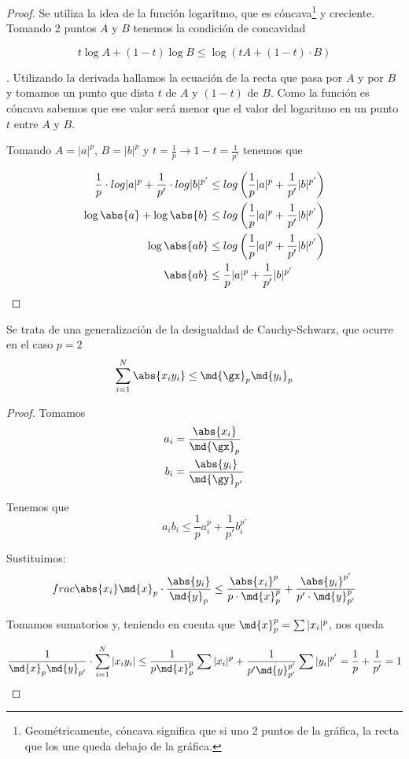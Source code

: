 \documentclass{apuntes}
\begin{document}
\begin{proof}
Se utiliza la idea de la función logaritmo, que es cóncava\footnote{Geométricamente, cóncava significa que si uno 2 puntos de la gráfica, la recta que los une queda debajo de la gráfica.} y creciente.  Tomando 2 puntos $A$ y $B$ tenemos la condición de concavidad 

\[ t \log A + (1-t) \log B \leq \log (tA + (1-t) \cdot B)\]

. Utilizando la derivada hallamos la ecuación de la recta que pasa por $A$ y por $B$ y tomamos un punto que dista $t$ de $A$ y $(1-t)$ de $B$. Como la función es cóncava sabemos que ese valor será menor que el valor del logaritmo en un punto $t$ entre $A$ y $B$.

Tomando $A=|a| ^ p$, $B = |b| ^ p$ y $t = \frac{1}{p} \rightarrow 1-t = \frac{1}{p'}$ tenemos que

\begin{align*}
\frac{1}{p}\cdot log |a|^p + \frac{1}{p'} \cdot log|b|^{p'} &\leq log\left(\frac{1}{p}|a|^p + \frac{1}{p'} |b|^{p'}\right) \\
\log \abs{a} + \log \abs{b} &\leq log\left(\frac{1}{p}|a|^p + \frac{1}{p'} |b|^{p'}\right) \\
\log \abs{ab} &\leq log\left(\frac{1}{p}|a|^p + \frac{1}{p'} |b|^{p'}\right) \\
\abs{ab} &\leq \frac{1}{p}|a|^p + \frac{1}{p'} |b|^{p'} 
\end{align*}

\end{proof} 
\begin{theorem} Se trata de una generalización de la desigualdad de Cauchy-Schwarz, que ocurre en el caso $p=2$
\[ \sum_{i=1} ^ N \abs{x_i y_i} \leq \md{\gx}_p \md{y_i}_p \]

\label{thmHolder}
\end{theorem}

\begin{proof} Tomamos  
 \begin{align*}
 a_i &= \frac{\abs{x_i}}{\md{\gx}_p} \\
 b_i &= \frac{\abs{y_i}}{\md{\gy}_{p'}}
 \end{align*}
 
 Tenemos que \[ a_i b_i \leq \frac{1}{p}a_i ^ p + \frac{1}{p'} b_i^{p'} \]
 
 Sustituimos: 
 \[  frac{\abs{x_i}}{\md{x}_{p}} \cdot \frac{\abs{y_i}}{\md{y}_{p}} \leq \frac{\abs{x_i}^p}{p\cdot \md{x}_{p}^p} + \frac{\abs{y_i}^{p'}}{p'\cdot\md{y}_{p'}^{p}} \]
 
 Tomamos sumatorios y, teniendo en cuenta que $\md{x}_{p}^p = \sum|x_i|^p$, nos queda 
 
 \[ \frac{1}{\md{x}_{p}\md{y}_{p'}}\cdot \sum_{i=1}^N |x_iy_i| \leq \frac{1}{p\md{x}_{p}^p} \sum |x_i|^p + \frac{1}{p'\md{y}_{p'}^{p'}} \sum |y_i|^{p'} = \frac{1}{p} + \frac{1}{p'} = 1 \]
 
 \end{proof}
 
\end{document}

